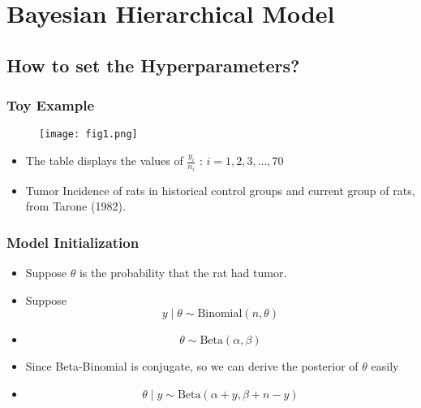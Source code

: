 \documentclass{beamer}
\begin{document}
\section{Bayesian Hierarchical Model} %

\begin{frame}
\sectionpage %
\end{frame}

\subsection{How to set the Hyperparameters?} %
\begin{frame}
\frametitle{Toy Example}
\begin{figure}
\texttt{[image: fig1.png]}\\
\footnotesize{}
\end{figure}
\begin{itemize}
\item The table displays the values of $\frac{y_{i}}{n_{i}}$ : $i = 1,2,3,...,70$ \\
\item Tumor Incidence of rats in historical control groups and current group of rats, from Tarone (1982). 
\end{itemize}
\end{frame}


\begin{frame}
\frametitle{Model Initialization}
\begin{itemize}
\item Suppose $\theta$ is the probability that the rat had tumor.
\item Suppose $$y \mid \theta \sim \text{Binomial}(n,\theta)$$
\item $$\theta \sim \text{Beta}(\alpha, \beta)$$
\item Since Beta-Binomial is conjugate, so we can derive the posterior of $\theta$ easily
\item $$\theta\mid y \sim \text{Beta}(\alpha + y, \beta + n - y)$$
\end{itemize}
\end{frame}
\end{document}
